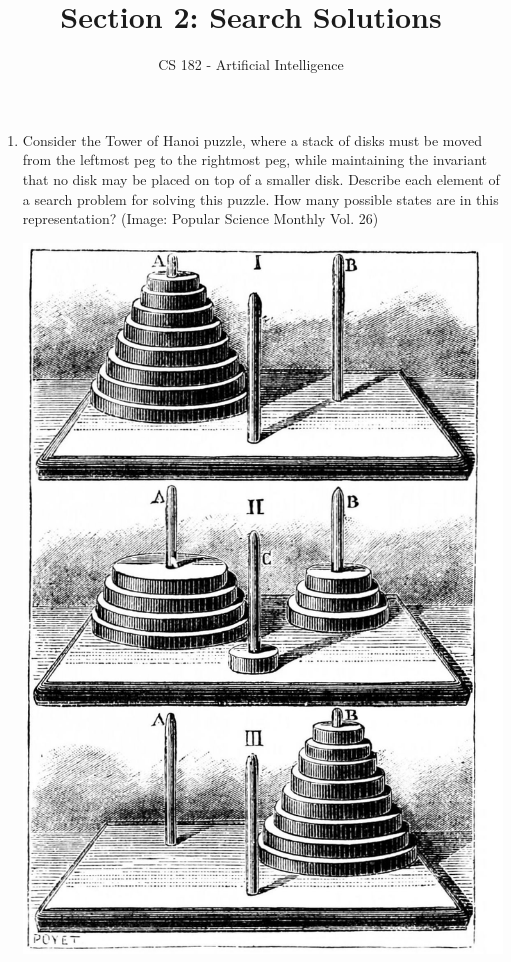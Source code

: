 \documentclass[11pt]{article}
\title{Section 2: Search Solutions}
\date{}
\author{CS 182 - Artificial Intelligence}
\begin{document}
\maketitle


\renewcommand{\labelenumii}{\arabic{enumii}.}
\setlength{\parindent}{0pt}

\begin{enumerate}

\item
Consider the Tower of Hanoi puzzle, where a stack of disks
must be moved from the leftmost peg to the rightmost peg, while maintaining
the invariant that no disk may be placed on top of a smaller disk.
Describe each element of a
search problem for solving this puzzle. How many possible states are in
this representation? (Image: Popular Science Monthly Vol. 26)

\includegraphics[scale=0.15, right]{img/hanoi}


\end{enumerate}
\end{document}
